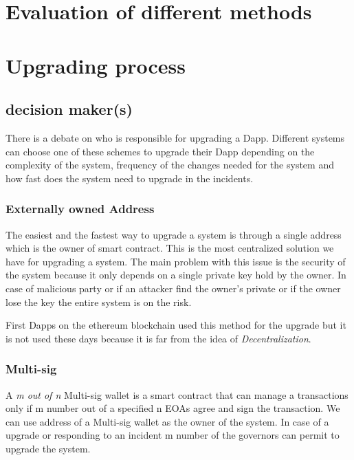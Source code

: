  \section{Evaluation of different methods}

 \section{Upgrading process}


 \subsection{decision maker(s)}
 There is a debate on who is responsible for upgrading a Dapp. Different systems can choose one of these schemes to upgrade their Dapp depending on the complexity of the system, frequency of the changes needed for the system and how fast does the system need to upgrade in the incidents.

 \subsubsection{Externally owned Address}
The easiest and the fastest way to upgrade a system is through a single address which is the owner of smart contract. This is the most centralized solution we have for upgrading a system. The main problem with this issue is the security of the system because it only depends on a single private key hold by the owner. In case of malicious party or if an attacker find the owner's private or if the owner lose the key the entire system is on the risk.

First Dapps on the ethereum blockchain used this method for the upgrade but it is not used these days because it is far from the idea of \textit{Decentralization}. 

 \subsubsection{Multi-sig}
 A \textit{m out of n} Multi-sig wallet is a smart contract that can manage a transactions only if m number out of a specified n EOAs agree and sign the transaction. We can use address of a Multi-sig wallet as the owner of the system. In case of a upgrade or responding to an incident m number of the governors can permit to upgrade the system.

